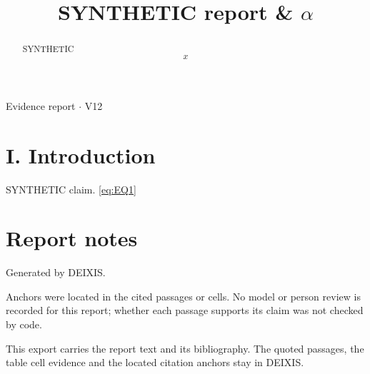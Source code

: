 \documentclass[journal]{IEEEtran}
\begin{document}
\title{SYNTHETIC report \& \ensuremath{\alpha}}

\maketitle

\noindent Evidence report \ensuremath{\cdot} V12

\begin{abstract}

SYNTHETIC
\begin{equation}
\label{eq:EQ1}
x
\end{equation}
\cite{Synth26}

\end{abstract}

\section*{I. Introduction}

SYNTHETIC claim. \eqref{eq:EQ1} \cite{Synth26}

\section*{Report notes}

Generated by DEIXIS.

Anchors were located in the cited passages or cells. No model or person review is recorded for this report; whether each passage supports its claim was not checked by code.

This export carries the report text and its bibliography. The quoted passages, the table cell evidence and the located citation anchors stay in DEIXIS.




\end{document}

